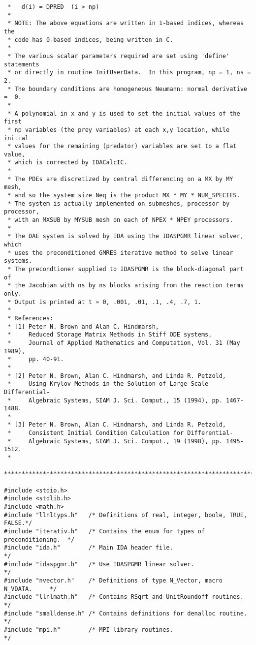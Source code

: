 \documentclass[11pt]{article}
\begin{document}
\begin{verbatim}
 *   d(i) = DPRED  (i > np)
 *  
 * NOTE: The above equations are written in 1-based indices, whereas the
 * code has 0-based indices, being written in C.
 *
 * The various scalar parameters required are set using 'define' statements 
 * or directly in routine InitUserData.  In this program, np = 1, ns = 2.
 * The boundary conditions are homogeneous Neumann: normal derivative  =  0.
 *
 * A polynomial in x and y is used to set the initial values of the first
 * np variables (the prey variables) at each x,y location, while initial
 * values for the remaining (predator) variables are set to a flat value,
 * which is corrected by IDACalcIC.
 *
 * The PDEs are discretized by central differencing on a MX by MY mesh,
 * and so the system size Neq is the product MX * MY * NUM_SPECIES.
 * The system is actually implemented on submeshes, processor by processor,
 * with an MXSUB by MYSUB mesh on each of NPEX * NPEY processors.
 * 
 * The DAE system is solved by IDA using the IDASPGMR linear solver, which
 * uses the preconditioned GMRES iterative method to solve linear systems.
 * The precondtioner supplied to IDASPGMR is the block-diagonal part of
 * the Jacobian with ns by ns blocks arising from the reaction terms only.
 * Output is printed at t = 0, .001, .01, .1, .4, .7, 1.
 *
 * References:
 * [1] Peter N. Brown and Alan C. Hindmarsh,
 *     Reduced Storage Matrix Methods in Stiff ODE systems,
 *     Journal of Applied Mathematics and Computation, Vol. 31 (May 1989),
 *     pp. 40-91.
 *
 * [2] Peter N. Brown, Alan C. Hindmarsh, and Linda R. Petzold,
 *     Using Krylov Methods in the Solution of Large-Scale Differential-
 *     Algebraic Systems, SIAM J. Sci. Comput., 15 (1994), pp. 1467-1488.
 * 
 * [3] Peter N. Brown, Alan C. Hindmarsh, and Linda R. Petzold,
 *     Consistent Initial Condition Calculation for Differential-
 *     Algebraic Systems, SIAM J. Sci. Comput., 19 (1998), pp. 1495-1512.
 * 
 ************************************************************************/

#include <stdio.h>
#include <stdlib.h>
#include <math.h>
#include "llnltyps.h"   /* Definitions of real, integer, boole, TRUE, FALSE.*/
#include "iterativ.h"   /* Contains the enum for types of preconditioning.  */
#include "ida.h"        /* Main IDA header file.                            */
#include "idaspgmr.h"   /* Use IDASPGMR linear solver.                      */
#include "nvector.h"    /* Definitions of type N_Vector, macro N_VDATA.     */
#include "llnlmath.h"   /* Contains RSqrt and UnitRoundoff routines.        */
#include "smalldense.h" /* Contains definitions for denalloc routine.       */
#include "mpi.h"        /* MPI library routines.                            */


\end{verbatim}
\end{document}
